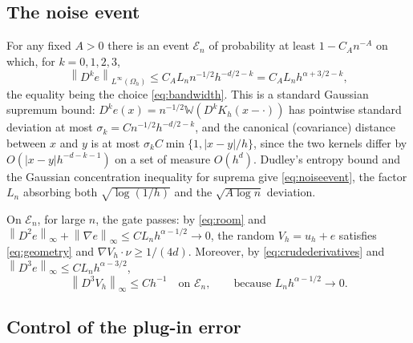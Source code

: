 \documentclass[11pt]{article}
\numberwithin{equation}{section}
\newcommand{\norm}[1]{\left\|#1\right\|}
\begin{document}
\subsection{The noise event}\label{sec:noise}

For any fixed $A>0$ there is an event $\mathcal E_n$ of probability at
least $1-C_An^{-A}$ on which, for $k=0,1,2,3$,
\begin{equation}\label{eq:noiseevent}
 \norm{D^ke}_{L^\infty(\Omega_h)}
 \le C_A L_n n^{-1/2}h^{-d/2-k}
 =C_A L_n h^{\alpha+3/2-k},
\end{equation}
the equality being the choice \eqref{eq:bandwidth}. This is a standard
Gaussian supremum bound: $D^ke(x)=n^{-1/2}\mathbb W(D^kK_h(x-\cdot))$
has pointwise standard deviation at most
$\sigma_k=Cn^{-1/2}h^{-d/2-k}$, and the canonical (covariance) distance
between $x$ and $y$ is at most $\sigma_kC\min\{1,|x-y|/h\}$, since the
two kernels differ by $O(|x-y|h^{-d-k-1})$ on a set of measure
$O(h^d)$. Dudley's entropy bound and the Gaussian concentration
inequality for suprema \cite[Section 2.3 and Theorem 2.5.8]{GN} give
\eqref{eq:noiseevent}, the factor $L_n$ absorbing both
$\sqrt{\log(1/h)}$ and the $\sqrt{A\log n}$ deviation.

On $\mathcal E_n$, for large $n$, the gate passes: by \eqref{eq:room}
and $\norm{D^2e}_\infty+\norm{\nabla e}_\infty\le CL_nh^{\alpha-1/2}\to0$,
the random $V_h=u_h+e$ satisfies \eqref{eq:geometry} and
$\nabla V_h\cdot\nu\ge1/(4d)$. Moreover, by \eqref{eq:crudederivatives}
and $\norm{D^3e}_\infty\le CL_nh^{\alpha-3/2}$,
\begin{equation}\label{eq:D3V}
 \norm{D^3V_h}_\infty\le Ch^{-1}\quad\text{on }\mathcal E_n,
 \qquad\text{because }L_nh^{\alpha-1/2}\to0 .
\end{equation}

\subsection{Control of the plug-in error}\label{sec:plugin}
\end{document}
